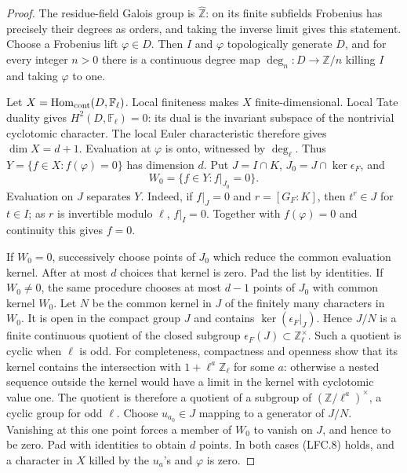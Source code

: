 \documentclass[11pt,a4paper]{article}
\numberwithin{equation}{section}
\theoremstyle{remark}\newtheorem{remark}[theorem]{Remark}
\begin{document}
\begin{proof}
The residue-field Galois group is \(\widehat{\mathbb Z}\):
on its finite subfields Frobenius has precisely their degrees
as orders, and taking the inverse limit gives this statement.
Choose a Frobenius lift \(\varphi\in D\).  Then \(I\) and
\(\varphi\) topologically generate \(D\), and for every
integer \(n>0\) there is a continuous degree map
\(\deg_n:D\to\mathbb Z/n\) killing \(I\) and taking
\(\varphi\) to one.

Let \(X=\operatorname{Hom}_{\rm cont}(D,\mathbb F_\ell)\).
Local finiteness makes \(X\) finite-dimensional.
Local Tate duality gives \(H^2(D,\mathbb F_\ell)=0\):
its dual is the invariant subspace of the nontrivial
cyclotomic character.  The local Euler characteristic therefore
gives \(\dim X=d+1\).
Evaluation at \(\varphi\) is onto, witnessed by \(\deg_\ell\).
Thus \(Y=\{f\in X:f(\varphi)=0\}\) has dimension \(d\).
Put \(J=I\cap K\), \(J_0=J\cap\ker\epsilon_F\), and
\[
                   W_0=\{f\in Y:f|_{J_0}=0\}.
 \]
Evaluation on \(J\) separates \(Y\).  Indeed, if \(f|_J=0\)
and \(r=[G_F:K]\), then \(t^r\in J\) for \(t\in I\);
as \(r\) is invertible modulo \(\ell\), \(f|_I=0\).
Together with \(f(\varphi)=0\) and continuity this gives
\(f=0\).

If \(W_0=0\), successively choose points of \(J_0\) which
reduce the common evaluation kernel.  After at most \(d\)
choices that kernel is zero.  Pad the list by identities.
If \(W_0\ne0\), the same procedure chooses at most \(d-1\)
points of \(J_0\) with common kernel \(W_0\).
Let \(N\) be the common kernel in \(J\) of the finitely many
characters in \(W_0\).  It is open in the compact group \(J\)
and contains \(\ker(\epsilon_F|_J)\).
Hence \(J/N\) is a finite continuous quotient of the closed
subgroup \(\epsilon_F(J)\subset\mathbb Z_\ell^\times\).
Such a quotient is cyclic when \(\ell\) is odd.
For completeness, compactness and openness show that its
kernel contains the intersection with \(1+\ell^a\mathbb Z_\ell\)
for some \(a\): otherwise a nested sequence outside the
kernel would have a limit in the kernel with cyclotomic value
one.  The quotient is therefore a quotient of a subgroup of
\((\mathbb Z/\ell^a)^\times\), a cyclic group for odd \(\ell\).
Choose \(u_{a_0}\in J\) mapping to a generator of \(J/N\).
Vanishing at this one point forces a member of \(W_0\) to
vanish on \(J\), and hence to be zero.  Pad with identities
to obtain \(d\) points.  In both cases (LFC.8) holds, and
a character in \(X\) killed by the \(u_a\)'s and \(\varphi\)
is zero.


\end{proof}
\end{document}
